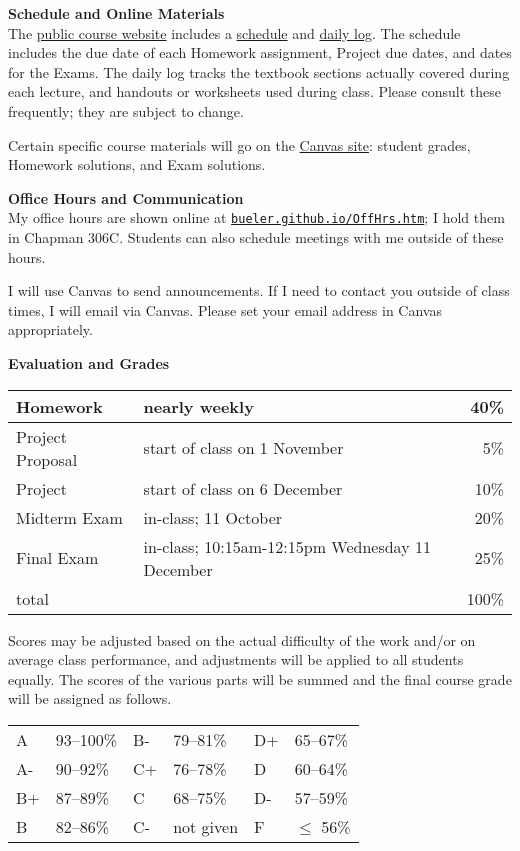 \documentclass[12pt]{article}
\renewcommand{\emph}[1]{\textsf{\textbf{#1}}}
\newcommand{\localhead}[1]{\par\smallskip\textbf{#1} \smallskip\nobreak\\}%
\def\heading#1{\localhead{\large\emph{#1}}}
\begin{document}
\heading{Schedule and Online Materials}
The \href{https://bueler.github.io/numerical/}{public course website} includes a \href{https://bueler.github.io/numerical/assets/general/F24/schedule.pdf}{schedule} and \href{https://bueler.github.io/numerical/daily.html}{daily log}.  The schedule includes the due date of each Homework assignment, Project due dates, and dates for the Exams.  The daily log tracks the textbook sections actually covered during each lecture, and handouts or worksheets used during class.  Please consult these frequently; they are subject to change.

Certain specific course materials will go on the \href{https://canvas.alaska.edu/courses/21626}{Canvas site}: student grades, Homework solutions, and Exam solutions.

\heading{Office Hours and Communication}
My office hours are shown online at \href{http://bueler.github.io/OffHrs.htm}{\texttt{bueler.github.io/OffHrs.htm}}; I hold them in Chapman 306C.  Students can also schedule meetings with me outside of these hours.

I will use Canvas to send announcements.  If I need to contact you outside of class times, I will email via Canvas.  Please set your email address in Canvas appropriately.

\heading{Evaluation and Grades}
\vskip -10pt

\begin{tabular}{|l|l|r|}
\hline
Homework         & nearly weekly & 40\% \\
\hline
Project Proposal & start of class on 1 November & 5\% \\
\hline
Project          & start of class on 6 December & 10\% \\
\hline
Midterm Exam     & in-class; 11 October & 20\%  \\
\hline
Final Exam       & in-class; 10:15am-12:15pm Wednesday 11 December & 25\% \\
\hline
total            & & 100\% \\
\hline
\end{tabular}

Scores may be adjusted based on the actual difficulty of the work and/or on average class performance, and adjustments will be applied to all students equally.  The scores of the various parts will be summed and the final course grade will be assigned as follows.

\begin{tabular}{llllll}
A  & 93--100\% & B- & 79--81\%  & D+ & 65--67\%  \\
A- & 90--92\%  & C+ & 76--78\%  & D  & 60--64\%  \\
B+ & 87--89\%  & C  & 68--75\%  & D- & 57--59\%  \\
B  & 82--86\%  & C- & not given & F  & $\le$ 56\%
\end{tabular}
\end{document}
